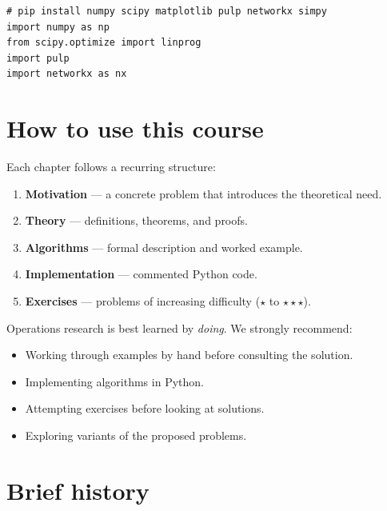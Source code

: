 \begin{codeblock}[title=\textbf{Installing dependencies}]
\begin{verbatim}
# pip install numpy scipy matplotlib pulp networkx simpy
import numpy as np
from scipy.optimize import linprog
import pulp
import networkx as nx
\end{verbatim}
\end{codeblock}

\section*{How to use this course}

Each chapter follows a recurring structure:
\begin{enumerate}
  \item \textbf{Motivation} --- a concrete problem that introduces the
        theoretical need.
  \item \textbf{Theory} --- definitions, theorems, and proofs.
  \item \textbf{Algorithms} --- formal description and worked example.
  \item \textbf{Implementation} --- commented Python code.
  \item \textbf{Exercises} --- problems of increasing difficulty
        ($\star$ to $\star\star\star$).
\end{enumerate}

\begin{bestpractice}[title=\textbf{Active learning}]
Operations research is best learned by \textit{doing}. We strongly recommend:
\begin{itemize}
  \item Working through examples by hand before consulting the solution.
  \item Implementing algorithms in Python.
  \item Attempting exercises before looking at solutions.
  \item Exploring variants of the proposed problems.
\end{itemize}
\end{bestpractice}

\section*{Brief history}

